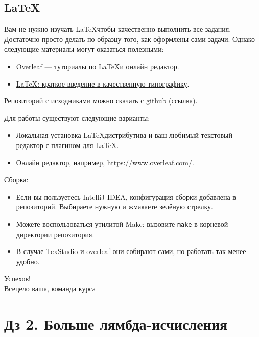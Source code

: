 \documentclass{article}
\begin{document}
    \subsection*{\LaTeX}

    Вам не нужно изучать \LaTeX чтобы качественно выполнить все задания.
    Достаточно просто делать по образцу того, как оформлены сами задачи.
    Однако следующие материалы могут оказаться полезными:

    \begin{itemize}
        \item \href{https://www.overleaf.com/learn}{Overleaf} --- туториалы по \LaTeX и онлайн редактор.
        \item \href{https://youtu.be/NOslSvJs29I}{LaTeX: краткое введение в качественную типографику}.
    \end{itemize}

    Репозиторий с исходниками можно скачать с github (\href{https://github.com/mse-fp2023/calculus-hws}{ссылка}).

    Для работы существуют следующие варианты:
    \begin{itemize}
        \item Локальная установка \LaTeX дистрибутива и ваш любимый текстовый редактор с плагином для \LaTeX.
        \item Онлайн редактор, например, \url{https://www.overleaf.com/}.
    \end{itemize}

    Сборка:
    \begin{itemize}
        \item Если вы пользуетесь IntelliJ IDEA, конфигурация сборки добавлена в репозиторий.
        Выбираете нужную и жмакаете зелёную стрелку.
        \item Можете воспользоваться утилитой Make: вызовите \texttt{make} в корневой директории репозитория.
        \item В случае TexStudio и overleaf они собирают сами, но работать так менее удобно.
    \end{itemize}

    \begin{flushright}
        Успехов! \\
        Всецело ваша, команда курса
    \end{flushright}

    \newpage


    \section*{Дз 2. Больше лямбда-исчисления}
\end{document}
